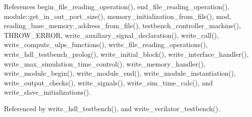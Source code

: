 References begin\+\_\+file\+\_\+reading\+\_\+operation(), end\+\_\+file\+\_\+reading\+\_\+operation(), module\+::get\+\_\+in\+\_\+out\+\_\+port\+\_\+size(), memory\+\_\+initialization\+\_\+from\+\_\+file(), mod, reading\+\_\+base\+\_\+memory\+\_\+address\+\_\+from\+\_\+file(), testbench\+\_\+controller\+\_\+machine(), T\+H\+R\+O\+W\+\_\+\+E\+R\+R\+OR, write\+\_\+auxiliary\+\_\+signal\+\_\+declaration(), write\+\_\+call(), write\+\_\+compute\+\_\+ulps\+\_\+functions(), write\+\_\+file\+\_\+reading\+\_\+operations(), write\+\_\+hdl\+\_\+testbench\+\_\+prolog(), write\+\_\+initial\+\_\+block(), write\+\_\+interface\+\_\+handler(), write\+\_\+max\+\_\+simulation\+\_\+time\+\_\+control(), write\+\_\+memory\+\_\+handler(), write\+\_\+module\+\_\+begin(), write\+\_\+module\+\_\+end(), write\+\_\+module\+\_\+instantiation(), write\+\_\+output\+\_\+checks(), write\+\_\+signals(), write\+\_\+sim\+\_\+time\+\_\+calc(), and write\+\_\+slave\+\_\+initializations().



Referenced by write\+\_\+hdl\+\_\+testbench(), and write\+\_\+verilator\+\_\+testbench().

